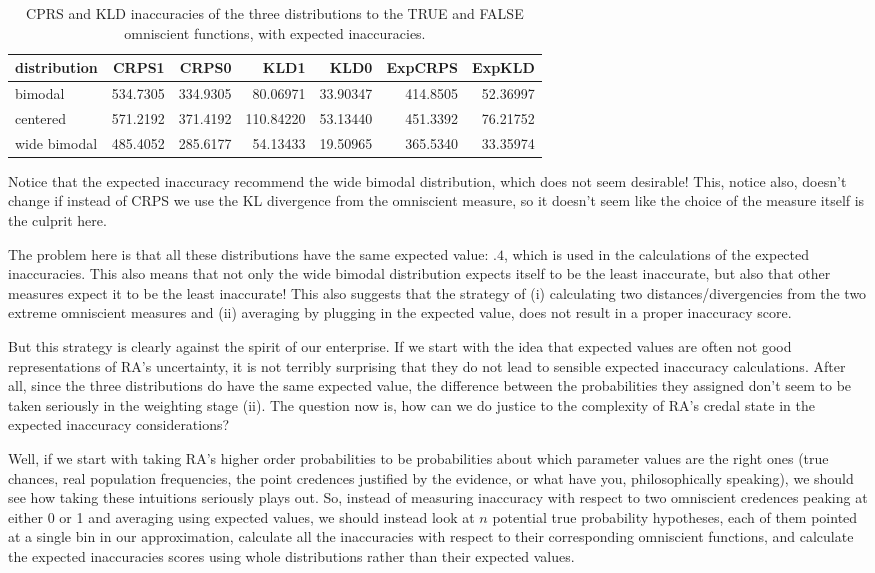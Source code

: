 \documentclass[
  10pt,
  dvipsnames,enabledeprecatedfontcommands]{scrartcl}
\begin{document}
\begin{table}[H]
\centering
\begin{tabular}{lrrrrrr}
\toprule
distribution & CRPS1 & CRPS0 & KLD1 & KLD0 & ExpCRPS & ExpKLD\\
\midrule
bimodal & 534.7305 & 334.9305 & 80.06971 & 33.90347 & 414.8505 & 52.36997\\
centered & 571.2192 & 371.4192 & 110.84220 & 53.13440 & 451.3392 & 76.21752\\
wide bimodal & 485.4052 & 285.6177 & 54.13433 & 19.50965 & 365.5340 & 33.35974\\
\bottomrule
\end{tabular}
\caption{CPRS and KLD inaccuracies of the three distributions to the TRUE and FALSE omniscient functions, with expected inaccuracies.}
\end{table}

Notice that the expected inaccuracy recommend the wide bimodal
distribution, which does not seem desirable! This, notice also, doesn't
change if instead of CRPS we use the KL divergence from the omniscient
measure, so it doesn't seem like the choice of the measure itself is the
culprit here.

The problem here is that all these distributions have the same expected
value: \(.4\), which is used in the calculations of the expected
inaccuracies. This also means that not only the wide bimodal
distribution expects itself to be the least inaccurate, but also that
other measures expect it to be the least inaccurate! This also suggests
that the strategy of (i) calculating two distances/divergencies from the
two extreme omniscient measures and (ii) averaging by plugging in the
expected value, does not result in a proper inaccuracy score.

But this strategy is clearly against the spirit of our enterprise. If we
start with the idea that expected values are often not good
representations of RA's uncertainty, it is not terribly surprising that
they do not lead to sensible expected inaccuracy calculations. After
all, since the three distributions do have the same expected value, the
difference between the probabilities they assigned don't seem to be
taken seriously in the weighting stage (ii). The question now is, how
can we do justice to the complexity of RA's credal state in the expected
inaccuracy considerations?

Well, if we start with taking RA's higher order probabilities to be
probabilities about which parameter values are the right ones (true
chances, real population frequencies, the point credences justified by
the evidence, or what have you, philosophically speaking), we should see
how taking these intuitions seriously plays out. So, instead of
measuring inaccuracy with respect to two omniscient credences peaking at
either 0 or 1 and averaging using expected values, we should instead
look at \(n\) potential true probability hypotheses, each of them
pointed at a single bin in our approximation, calculate all the
inaccuracies with respect to their corresponding omniscient functions,
and calculate the expected inaccuracies scores using whole distributions
rather than their expected values.
\end{document}
